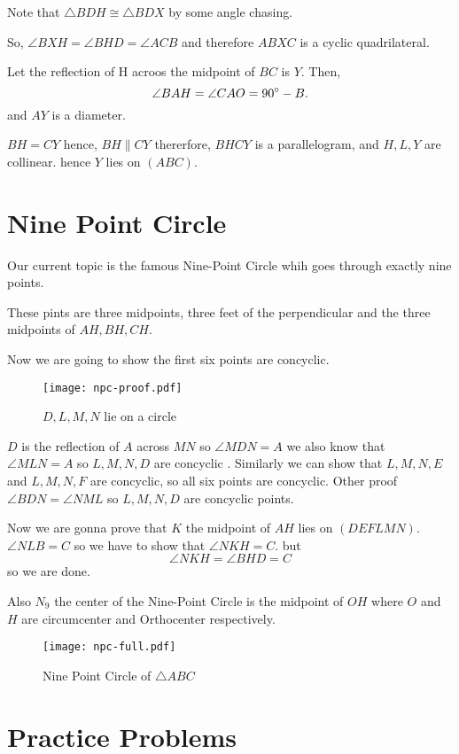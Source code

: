 Note that \(\triangle BDH \cong \triangle BDX\) by some angle chasing.

So, \(\angle BXH = \angle BHD = \angle ACB\) and therefore \(ABXC\) is a cyclic quadrilateral.

Let the reflection of H acroos the midpoint of \(BC\) is \(Y\).
Then, \[\angle BAH = \angle CAO=90^\circ - B.\]
and \(AY\) is a diameter.

\(BH=CY\) hence, \(BH\parallel CY\) thererfore, \(BHCY\) is a parallelogram, and \(H,L,Y\) are collinear. hence \(Y\) lies on \((ABC)\).




\section{Nine Point Circle}
Our current topic is the famous Nine-Point Circle whih goes through exactly nine points.

These pints are three midpoints, three feet of the perpendicular and the three midpoints of \(AH,BH,CH\).

Now we are going to show the first six points are concyclic.
\begin{figure}[ht] 
\centering
		\texttt{[image: npc-proof.pdf]}
\caption{\(D,L,M,N\) lie on a circle}
\end{figure}
\(D\) is the reflection of \(A\) across \(MN\)
so \(\angle MDN = A\) we also know that \(\angle MLN = A\) so \(L,M,N,D\) are concyclic . Similarly we can show that \(L,M,N,E\) and \(L,M,N,F\) are concyclic, so all six points are concyclic.
Other proof \(\angle BDN = \angle NML\) so \(L,M,N,D\) are concyclic points.


Now we are gonna prove that \(K\) the midpoint of \(AH\) lies on \((DEFLMN)\). 
\(\angle NLB = C \) so we have to show that \(\angle NKH = C\). but \[ \angle NKH= \angle BHD = C\] so we are done.

Also \(N_9\) the center of the Nine-Point Circle is the midpoint of \(OH\) where \(O\) and \(H\) are circumcenter and Orthocenter respectively.

\begin{figure}[ht] 
\centering
	\texttt{[image: npc-full.pdf]}
\caption{Nine Point Circle of \(\triangle ABC\)}
\end{figure}


\section{Practice Problems}

